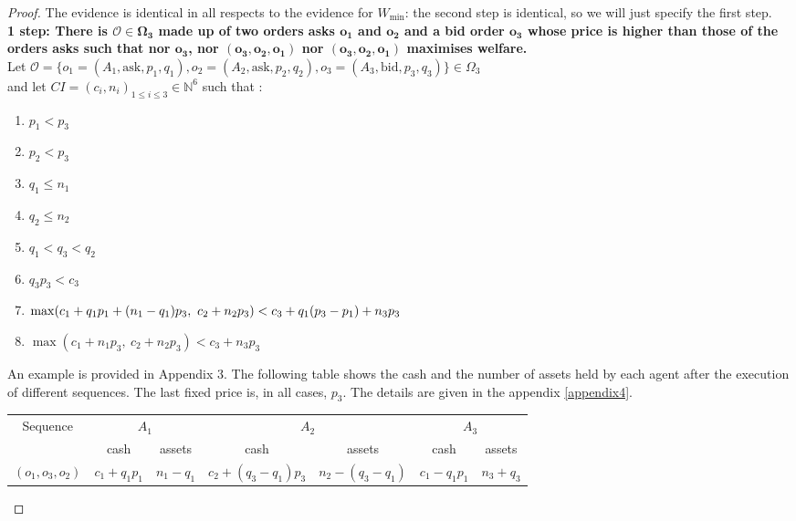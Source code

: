 \documentclass[a4paper]{article}
\newcommand{\N}{\mathbb{N}}
\newcommand{\Oc}{\mathcal{O}}
\newtheorem[style=S, bodystyle=\noindent]{thm}{Theorem}[section]
\newtheorem[style=S, bodystyle=\noindent]{defn}[thm]{Definition}
\newtheorem[style=S, bodystyle=\noindent]{propo}[thm]{Proposition}
\newtheorem[style=S, bodystyle=\noindent]{prop}[thm]{Property}
\newtheorem[style=S, bodystyle=\noindent]{coro}[thm]{Corollary}
\newtheorem[style=S, bodystyle=\noindent]{lem}[thm]{Lemma}
\newtheorem[style=S, headstyle=\bfseries\boldmath Theorem, bodystyle=\noindent]{thm*}{Theorem}
\newtheorem[style=S, headstyle=\bfseries\boldmath Definition, bodystyle=\noindent]{defn*}{Definition}
\newtheorem[style=S, headstyle=\bfseries\boldmath Proposition, bodystyle=\noindent]{propo*}{Proposition}
\newtheorem[style=S, headstyle=\bfseries\boldmath Property, bodystyle=\noindent]{prop*}{Property}
\newtheorem[style=S, headstyle=\bfseries\boldmath Corollary, bodystyle=\noindent]{coro*}{Corollary}
\newtheorem[style=S, headstyle=\bfseries\boldmath Lemma, bodystyle=\noindent]{lem*}{Lemma}
\begin{document}
\begin{proof}
	The evidence is identical in all respects to the evidence for $W_{\min}$: the second step is identical, so we will just specify the first step. \\
	\textbf{1 step: There is $\boldsymbol{\Oc \in \Omega_3}$ made up of two orders asks $\boldsymbol{o_1}$ and $\boldsymbol{o_2}$ and a bid order $\boldsymbol{o_3}$ whose price is higher than those of the orders asks such that nor $\boldsymbol{o_3}$, nor $\boldsymbol{(o_3, o_2, o_1)}$ nor $\boldsymbol{(o_3, o_2, o_1)}$ maximises welfare.} \\
	Let $\Oc = \{o_1 = (A_1, \text{ask}, p_1, q_1) , o_2 = (A_2, \text{ask}, p_2, q_2), o_3 = (A_3, \text{bid}, p_3, q_3)\} \in \Omega_3$ \\ and let $CI = (c_i, n_i)_{1\leq i\leq 3} \in \N^6$ such that :
	\begin{multicols}{2}
	\begin{enumerate}
		\item $p_1 < p_3$
		\item $p_2 < p_3$
		\item $q_1 \leq n_1$
		\item $q_2 \leq n_2$\\
		\item $q_1 < q_3 < q_2$
		\item $q_3p_3 < c_3$
		\item $\max(c_1+q_1p_1+(n_1-q_1)p_3,~c_2+n_2p_3) \\ < c_3+q_1(p_3-p_1)+n_3p_3$
		\item $\max(c_1+n_1p_3,~c_2+n_2p_3) < c_3+n_3p_3$
	\end{enumerate}
	\end{multicols}
	An example is provided in Appendix 3.
	The following table shows the cash and the number of assets held by each agent after the execution of different sequences. The last fixed price is, in all cases, $p_3$. The details are given in the appendix \ref{appendix4}. \\
	\begin{center}
	\begin{tabular}{|c|c|c|c|c|c|c|}
		\hline
		\multirow{2}{*}{Sequence} & \multicolumn{2}{c|}{$A_1$} & \multicolumn{2}{c|}{$A_2$} & \multicolumn{2}{c|}{$A_3$} \\
		\cline{2-7}
		& cash & assets & cash & assets & cash & assets \\
		\hline
		\multirow{2}{*}{$(o_1, o_3, o_2)$} & \multirow{2}{*}{$c_1 + q_1p_1$} & \multirow{2}{*}{$n_1-q_1$} & \multirow{2}{*}{$c_2 + (q_3-q_1)p_3$} & \multirow{2}{*}{$n_2-(q_3-q_1)$} & $c_1 - q_1p_1$ & \multirow{2}{*}{$n_3+q_3$} \\

\end{tabular}
\end{center}
\end{proof}
\end{document}

